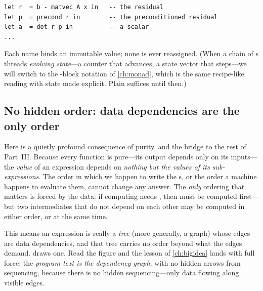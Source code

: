 \begin{lstlisting}[style=l4style]
let r  = b - matvec A x in   -- the residual
let p  = precond r in        -- the preconditioned residual
let a  = dot r p in          -- a scalar
...
\end{lstlisting}

\noindent Each name binds an immutable value; none is ever reassigned. (When a
chain of s threads \emph{evolving state}---a counter that advances, a
state vector that steps---we will switch to the -block notation of
\cref{ch:monad}, which is the same recipe-like reading with state made explicit.
Plain  suffices until then.)

\subsection{No hidden order: data dependencies are the only order}

Here is a quietly profound consequence of purity, and the bridge to the rest of
Part~III. Because every function is pure---its output depends only on its
inputs---the \emph{value} of an expression depends on \emph{nothing but the values
of its sub-expressions}. The order in which we happen to write the s, or
the order a machine happens to evaluate them, cannot change any answer. The
\emph{only} ordering that matters is forced by the data: if computing 
needs , then  must be computed first---but two intermediates that
do not depend on each other may be computed in either order, or at the same time.

This means an expression is really a \emph{tree} (more generally, a graph) whose
edges are data dependencies, and that tree carries no order beyond what the edges
demand.  draws one. Read the figure and the lesson of
\cref{ch:bigidea} lands with full force: the \emph{program text is the
dependency graph}, with no hidden arrows from sequencing, because there is no
hidden sequencing---only data flowing along visible edges.

